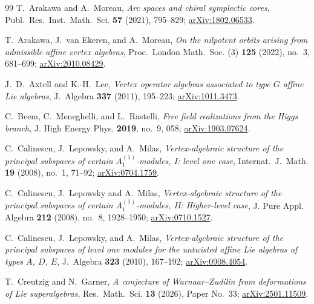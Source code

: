 \documentclass[11pt]{amsart}
\theoremstyle{definition}
\theoremstyle{remark}
\begin{document}
\begin{thebibliography}{99}
T.~Arakawa and A.~Moreau,
\emph{Arc spaces and chiral symplectic cores},
Publ.~Res.~Inst.~Math.~Sci. \textbf{57} (2021), 795--829;
\href{https://arxiv.org/abs/1802.06533}{arXiv:1802.06533}.

T.~Arakawa, J.~van Ekeren, and A.~Moreau,
\emph{On the nilpotent orbits arising from admissible affine vertex algebras},
Proc.~London Math.~Soc. (3) \textbf{125} (2022), no.~3, 681--699;
\href{https://arxiv.org/abs/2010.08429}{arXiv:2010.08429}.


J.~D.~Axtell and K.-H.~Lee,
\emph{Vertex operator algebras associated to type $G$ affine Lie algebras},
J.~Algebra \textbf{337} (2011), 195--223;
\href{https://arxiv.org/abs/1011.3473}{arXiv:1011.3473}.


C.~Beem, C.~Meneghelli, and L.~Rastelli,
\emph{Free field realizations from the Higgs branch},
J. High Energy Phys. \textbf{2019}, no.~9, 058;
\href{https://arxiv.org/abs/1903.07624}{arXiv:1903.07624}.





C.~Calinescu, J.~Lepowsky, and A.~Milas,
\emph{Vertex-algebraic structure of the principal subspaces of certain $A_1^{(1)}$-modules, I:
	level one case},
Internat.~J.~Math. \textbf{19} (2008), no.~1, 71--92;
\href{https://arxiv.org/abs/0704.1759}{arXiv:0704.1759}.


C.~Calinescu, J.~Lepowsky and A.~Milas,
\emph{Vertex-algebraic structure of the principal subspaces
	of certain $A_1^{(1)}$-modules, II: Higher-level case},
J. Pure Appl. Algebra \textbf{212} (2008), no.~8, 1928--1950;
\href{https://arxiv.org/abs/0710.1527}{arXiv:0710.1527}.

C.~Calinescu, J.~Lepowsky, and A.~Milas,
\emph{Vertex-algebraic structure of the principal subspaces of level one modules for the untwisted affine Lie algebras of types $A$, $D$, $E$},
J.~Algebra \textbf{323} (2010), 167--192;
\href{https://arxiv.org/abs/0908.4054}{arXiv:0908.4054}.







T.~Creutzig and N.~Garner,
\emph{A conjecture of Warnaar--Zudilin from deformations of Lie superalgebras},
Res.~Math.~Sci. \textbf{13} (2026), Paper No.~33;
\href{https://arxiv.org/abs/2501.11509}{arXiv:2501.11509}.




\end{thebibliography}
\end{document}
